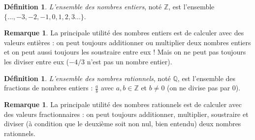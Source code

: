 \documentclass[a4paper,13pt]{scrreprt}
\theoremstyle{plain}
\theoremstyle{definition}
\newtheorem{déf}[subsection]{Définition}
\newtheorem{rema}[subsection]{Remarque}
\newcommand{\zz}{\mathbb{Z}}
\newcommand{\qu}{\mathbb{Q}}
\begin{document}
\begin{déf}
	\emph{L'ensemble des nombres entiers}, noté $\zz$, est l'ensemble $\{...,-3,-2,-1,0,1,2,3...\}$.
\end{déf}
\begin{rema}
	La principale utilité des nombres entiers est de calculer avec des valeurs entières : on peut toujours additionner ou multiplier deux nombres entiers et on peut aussi toujours les soustraire entre eux ! Mais on ne peut pas toujours les diviser entre eux ($-4/3$ n'est pas un nombre entier).
\end{rema}

\begin{déf}
	\emph{L'ensemble des nombres rationnels}, noté $\qu$, est l'ensemble des fractions de nombres entiers : $\frac{a}{b}$ avec $a,b \in \zz$ et $b \neq 0$ (on ne divise pas par $0$).
\end{déf}
\begin{rema}
	La principale utilité des nombres rationnels est de calculer avec des valeurs fractionnaires : on peut toujours additionner, multiplier, soustraire et diviser (à condition que le deuxième soit non nul, bien entendu) deux nombres rationnels.
\end{rema}
\end{document}
